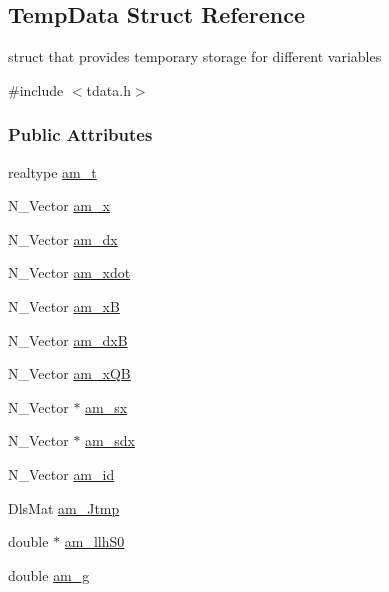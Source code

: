 \hypertarget{struct_temp_data}{}\subsection{Temp\+Data Struct Reference}
\label{struct_temp_data}


struct that provides temporary storage for different variables  




{\ttfamily \#include $<$tdata.\+h$>$}

\subsubsection*{Public Attributes}
\begin{DoxyCompactItemize}
\item 
realtype \hyperlink{struct_temp_data_ae0484650df254ad9cd8883e2ba028892}{am\+\_\+t}
\item 
N\+\_\+\+Vector \hyperlink{struct_temp_data_a4527d9abde45ba3982c35d2c12969d36}{am\+\_\+x}
\item 
N\+\_\+\+Vector \hyperlink{struct_temp_data_ac10ec733609d33c557d48c1cc4c9f6f1}{am\+\_\+dx}
\item 
N\+\_\+\+Vector \hyperlink{struct_temp_data_abad4a9e3cc9cd42b3fe4e2fe28a915c1}{am\+\_\+xdot}
\item 
N\+\_\+\+Vector \hyperlink{struct_temp_data_a318f0b9b1f4b33326184a350912c6fb1}{am\+\_\+x\+B}
\item 
N\+\_\+\+Vector \hyperlink{struct_temp_data_a6dc87d123304fe3c6a20899fca777501}{am\+\_\+dx\+B}
\item 
N\+\_\+\+Vector \hyperlink{struct_temp_data_ac4099b4f6bf1f15d7d07b88993515da7}{am\+\_\+x\+Q\+B}
\item 
N\+\_\+\+Vector $\ast$ \hyperlink{struct_temp_data_a5253085927038bdeb7c327aa14470722}{am\+\_\+sx}
\item 
N\+\_\+\+Vector $\ast$ \hyperlink{struct_temp_data_a2457438c1ae3ea571031bc3c2e440da2}{am\+\_\+sdx}
\item 
N\+\_\+\+Vector \hyperlink{struct_temp_data_ad918917fdce710fbd6fe9774e35bfcfb}{am\+\_\+id}
\item 
Dls\+Mat \hyperlink{struct_temp_data_aa850cd4b6b24d0b98b4aac8f42a057a1}{am\+\_\+\+Jtmp}
\item 
double $\ast$ \hyperlink{struct_temp_data_a542f10e5df61799d1c7c7d7e6ff18663}{am\+\_\+llh\+S0}
\item 
double \hyperlink{struct_temp_data_ae80bd7f1abedcaafe56c6a78384b5542}{am\+\_\+g}

\end{DoxyCompactItemize}
